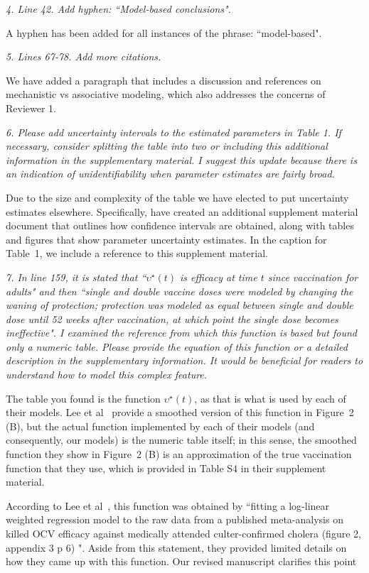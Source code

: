 \documentclass[11pt]{article}
\newcommand\report[1]{{\color{mygreen} \vspace{1mm}\hspace{0.25in}\parbox{6in}{\em #1}}}
\newcommand\article[1]{{\color{blue} \vspace{1mm}\hspace{0.25in}\parbox{6in}{\em #1}}}
\begin{document}
\report{
  4. Line 42. Add hyphen: ``Model-based conclusions".
}

A hyphen has been added for all instances of the phrase: ``model-based".

\report{
  5. Lines 67-78. Add more citations.
}

We have added a paragraph that includes a discussion and references on mechanistic vs associative modeling, which also addresses the concerns of Reviewer 1. 

\article{\editMechModels}

\report{
  6. Please add uncertainty intervals to the estimated parameters in Table 1. If necessary, consider splitting the table into two or including this additional information in the supplementary material. I suggest this update because there is an indication of unidentifiability when parameter estimates are fairly broad.
}

Due to the size and complexity of the table we have elected to put uncertainty estimates elsewhere. Specifically, have created an additional supplement material document that outlines how confidence intervals are obtained, along with tables and figures that show parameter uncertainty estimates. In the caption for Table~1, we include a reference to this supplement material. 

\report{
  7. In line 159, it is stated that ``$\upsilon^\star(t)$ is efficacy at time $t$ since vaccination for adults" and then ``single and double vaccine doses were modeled by changing the waning of protection; protection was modeled as equal between single and double dose until 52 weeks after vaccination, at which point the single dose becomes ineffective". I examined the reference from which this function is based but found only a numeric table. Please provide the equation of this function or a detailed description in the supplementary information. It would be beneficial for readers to understand how to model this complex feature.
}

The table you found is the function $\upsilon^\star(t)$, as that is what is used by each of their models. Lee et al~\cite{lee20} provide a smoothed version of this function in Figure~2 (B), but the actual function implemented by each of their models (and consequently, our models) is the numeric table itself; in this sense, the smoothed function they show in Figure~2 (B) is an approximation of the true vaccination function that they use, which is provided in Table S4 in their supplement material.

According to Lee et al~\cite{lee20}, this function was obtained by ``fitting a log-linear weighted regression model to the raw data from a published meta-analysis on killed OCV efficacy against medically attended culter-confirmed cholera (figure 2, appendix 3 p 6) \cite{bi17}". Aside from this statement, they provided limited details on how they came up with this function. Our revised manuscript clarifies this point
\end{document}
